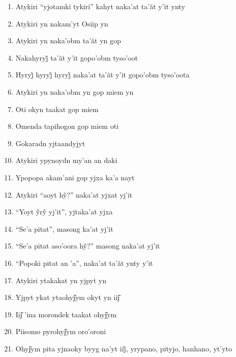 \begin{enumerate}
 \begin{center}\end{center}
 
 \item Atykiri ``yjotamki tykiri'' kahyt naka'at ta'ãt y'it ynty
 \item Atykiri yn nakam'yt Osiip yn
 \item Atykiri yn naka'obm ta'ãt yn gop
 \item Nakahyryj̃ ta’ãt y’it gopo’obm tyso’oot
 \item Hyryj̃ hyryj̃ hyryj̃ naka’at ta’ãt y’it gopo’obm tyso’oota
 
 \begin{center}\end{center}
 
 \item Atykiri yn naka'obm yn gop miem yn
 \item Oti okyn taakat gop miem
 \item Omenda tapihogon gop miem oti
 \item Gokaradn yjtaandyjyt
 \item Atykiri ypynoydn my'an an daki
 \item Ypopopa akam'ani gop yjxa ka'a nayt
 
 \begin{center}\end{center}
 
 \item Atykiri ``aoyt hỹ?'' naka’at yjxat yj’it
 \item ``Yoyt ỹrỹ yj’it'', yjtaka’at yjxa
 \item ``Se'a pitat'', masong ka'at yj'it
 \item ``Se’a pitat aso’oora hỹ?'' masong naka’at yj’it
 \item ``Popoki pitat an 'a'', naka'at ta'ãt ynty y'it
 
 \begin{center}\end{center}
 
 \item Atykiri ytakakat yn yjpyt yn
 \item Yjpyt ykat ytaohyj͂ym okyt yn iij͂
 \item Iij͂ 'ina morondek taakat ohyj͂ym
 \item Piisomo pyrohyj͂ym oro'oroni
 \item Ohyj͂ym pita yjnaoky byyg na’yt iij̃, yrypano, pityjo, hanhano, yt’yto
 

\end{enumerate}
